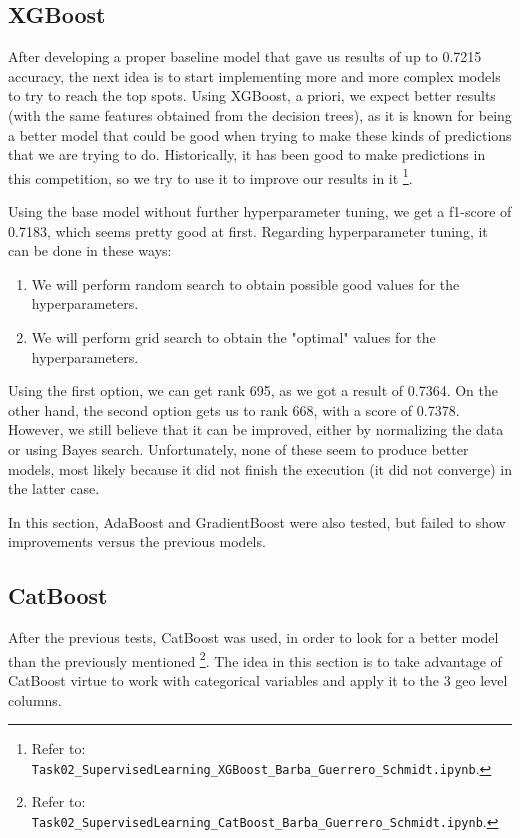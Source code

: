 \subsection{XGBoost}
\label{SUBSECTION_XGBoost}
After developing a proper baseline model that gave us results of up to 0.7215 accuracy, the next idea is to start implementing more and more complex models to try to reach the top spots. Using XGBoost, a priori, we expect better results (with the same features obtained from the decision trees), as it is known for being a better model that could be good when trying to make these kinds of predictions that we are trying to do. Historically, it has been good to make predictions in this competition, so we try to use it to improve our results in it \footnote{Refer to: \texttt{Task02\_SupervisedLearning\_XGBoost\_Barba\_Guerrero\_Schmidt.ipynb}.}.

Using the base model without further hyperparameter tuning, we get a f1-score of 0.7183, which seems pretty good at first. Regarding hyperparameter tuning, it can be done in these ways:
\begin{enumerate}
    \item We will perform random search to obtain possible good values for the hyperparameters.
    \item We will perform grid search to obtain the "optimal" values for the hyperparameters.
\end{enumerate}

Using the first option, we can get rank 695, as we got a result of 0.7364. On the other hand, the second option gets us to rank 668, with a score of 0.7378. However, we still believe that it can be improved, either by normalizing the data or using Bayes search. Unfortunately, none of these seem to produce better models, most likely because it did not finish the execution (it did not converge) in the latter case.

In this section, AdaBoost and GradientBoost were also tested, but failed to show improvements versus the previous models.
\subsection{CatBoost}
\label{SUBSECTION_CatBoost}

After the previous tests, CatBoost was used, in order to look for a better model than the previously mentioned \footnote{Refer to: \texttt{Task02\_SupervisedLearning\_CatBoost\_Barba\_Guerrero\_Schmidt.ipynb}.}. The idea in this section is to take advantage of CatBoost virtue to work with categorical variables and apply it to the 3 geo level columns.

